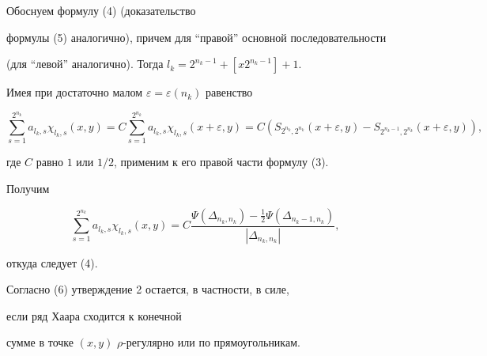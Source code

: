 \begin{pf}


Обоснуем формулу (4) (доказательство 


формулы (5) аналогично), причем для ``правой'' основной последовательности 


(для ``левой'' аналогично). Тогда $l_k=2^{n_k-1}+[x2^{n_k-1}]+1$. 


Имея при достаточно малом $\varepsilon=\varepsilon(n_k)$ равенство 


\begin{equation}


\sum\limits_{s=1}^{2^{n_k}}a_{l_k,s}


\chi_{l_k,s}(x,y)=C\sum\limits_{s=1}^{2^{n_k}}a_{l_k,s}


\chi_{l_k,s}(x+\varepsilon,y)=


C(S_{2^{n_k}, 2^{n_k}}(x+\varepsilon,y)-S_{2^{n_k-1}, 2^{n_k}}


(x+\varepsilon,y)),


\end{equation} 


где $C$ равно $1$ или $1/2$, применим к его правой части формулу (3). 


Получим


$$


\sum\limits_{s=1}^{2^{n_k}}a_{l_k,s}


\chi_{l_k,s}(x,y)=C\frac


{\Psi(\Delta_{n_k,n_k})-\frac{1}{2}\Psi(\Delta_{n_k-1,n_k})}


{|\Delta_{n_k,n_k}|},


$$ 


откуда следует (4).


\end{pf}





\begin{note}


Согласно (6) утверждение 2 остается, в частности, в силе, 


если ряд Хаара сходится к конечной 


сумме в точке $(x,y)$ $\rho$-регулярно или по прямоугольникам.


\end{note}





